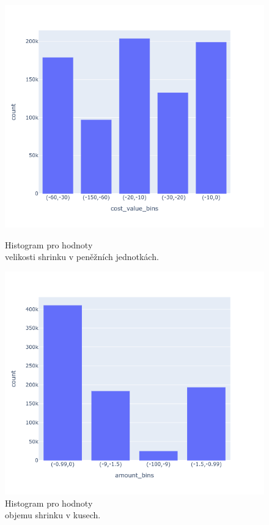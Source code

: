 \begin{figure}[h!]
    \centering
    \begin{minipage}[b]{.55\textwidth}
      \centering
      \captionsetup{justification=centering}

      \includegraphics[width=\textwidth]{obrazky/grafy/histogram/newplot(2).png}
      \vspace*{-3em}
      \caption{Histogram pro hodnoty \\ velikosti shrinku v peněžních jednotkách.}
      \label{obr:nb:hist}
    \end{minipage}%
    \hspace*{-2em}
    \begin{minipage}[b]{.55\textwidth}
        \centering
        \captionsetup{justification=centering}
        \includegraphics[width=\textwidth]{obrazky/grafy/histogram/newplot(1).png}
        \vspace*{-3em}
        \caption{Histogram pro hodnoty \\ objemu shrinku v kusech.}
        \label{obr:nb:hist2}
    \end{minipage}
\end{figure}
